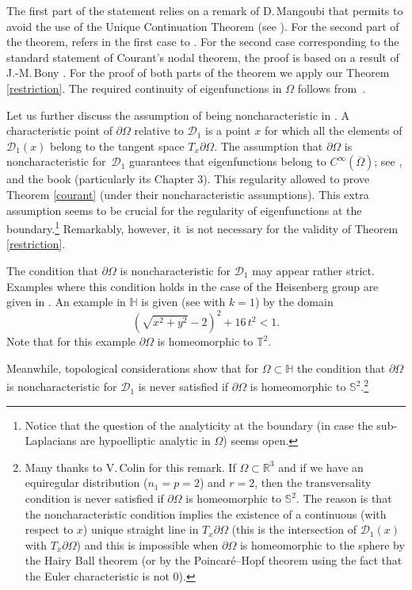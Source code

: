\documentclass[10pt]{amsart}
\theoremstyle{definition}
\newcommand{\1}{\mathbbm{1}}
\begin{document}
The first part of the statement relies on a remark of D.\,Mangoubi that permits to avoid the use of the Unique Continuation Theorem (see \cite[Exer.\,4.1.15]{LMP}). For the second part of the theorem, \cite{EL} refers in the first case to \cite{Wa}. For the second case corresponding to the standard statement of Courant's nodal theorem, the proof is based on a result of J.-M.\,Bony \cite{Bo}. For the proof of both parts of the theorem we apply our Theorem \ref{restriction}. The required continuity of eigenfunctions in $\Omega$ follows from~\cite{Ho}.

Let us further discuss the assumption of being noncharacteristic in \cite{EL}. A characteristic point of $\partial \Omega$ relative to $\mathcal D_1$ is a point $x$ for which all the elements of $\mathcal D_1(x)$ belong to the tangent space $T_x\partial \Omega$. The assumption that $\partial\Omega$ is noncharacteristic for~$\mathcal D_1$ guarantees that eigenfunctions belong to $C^\infty(\overline{\Omega})$; see \cite{De}, \cite{EL} and the book \cite{DGN} (particularly its Chapter 3). This regularity allowed \cite{EL} to prove Theorem \ref{courant} (under their noncharacteristic assumptions). This extra assumption seems to be crucial for the regularity of eigenfunctions at the boundary.\footnote{Notice that the question of the analyticity at the boundary (in case the sub-Laplacians are hypoelliptic analytic in $\Omega$) seems open.} Remarkably, however, it~is not necessary for the validity of Theorem \ref{restriction}.

The condition that $\partial\Omega$ is noncharacteristic for $\mathcal D_1$ may appear rather strict. Examples where this condition holds in the case of the Heisenberg group are given in \cite{DGN,MM}. An example in $\mathbb H$ is given (see \cite[Example 3.4]{MM} with $k=1$) by the domain
\[
(\sqrt{x^2+y^2} -2)^2 + 16 \,t^2 < 1.
\]
Note that for this example $\partial \Omega$ is homeomorphic to $\mathbb T^2$.

Meanwhile, topological considerations show that for $\Omega\subset\mathbb H$ the condition that $\partial\Omega$ is noncharacteristic for $\mathcal D_1$ is never satisfied if $\partial \Omega$ is homeomorphic to $\mathbb S^2$.\footnote{Many thanks to V.\,Colin for this remark.
If $\Omega \subset \mathbb R^3$ and if we have an equiregular distribution ($n_1=p=2$) and $r=2$, then
the transversality condition is never satisfied if $\partial \Omega$ is homeomorphic to $\mathbb S^2$.
The reason is that the noncharacteristic condition implies the existence of a continuous (with respect to $x$) unique straight line in $T_x \partial \Omega$ (this is the intersection of $\mathcal D_1(x)$ with $T_x \partial \Omega$) and this is impossible when $\partial \Omega$ is homeomorphic to the sphere by the Hairy Ball theorem (or by the Poincaré--Hopf theorem \cite{Miln} using the fact that the Euler characteristic is not $0$).}
\end{document}
